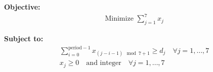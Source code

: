 \documentclass{article}
\begin{document}
\textbf{Objective:}
\begin{align*}
& \text{Minimize } \sum_{j=1}^7 x_j
\end{align*}

\textbf{Subject to:}
\begin{align*}
& \sum_{i=0}^{\text{period}-1} x_{(j-i-1) \mod 7 + 1} \geq d_j \quad \forall j = 1, \ldots, 7 \\
& x_j \geq 0 \quad \text{and integer} \quad \forall j = 1, \ldots, 7
\end{align*}
\end{document}

